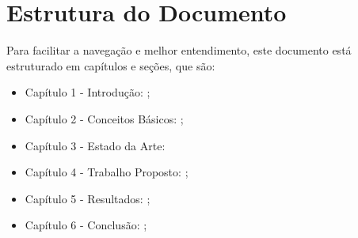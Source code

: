 \section{Estrutura do Documento}

Para facilitar a navegação e melhor entendimento, este documento está
estruturado em capítulos e seções, que são:
\begin{itemize}
\item {Capítulo 1 - Introdução}: \cite{Yu:2004:ESG:1015090.1015207};
\item {Capítulo 2 - Conceitos Básicos}: \cite{Cormen:2009};
\item {Capítulo 3 - Estado da Arte}: \cite{Weicker:1984:DSS:358274.358283}
\item {Capítulo 4 - Trabalho Propost}o: \cite{IEEE_802_11:6178212};
\item {Capítulo 5 - Resultados}: \cite{Linux:402081};
\item {Capítulo 6 - Conclusão}: \cite{SBC:2012};
\end{itemize}
